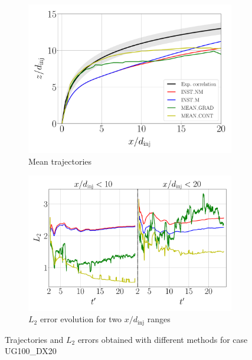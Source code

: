 \begin{figure}[ht]
\flushleft
\hspace{-0.5in}
\begin{subfigure}[b]{0.45\textwidth}
	\flushleft
   \includegraphics[scale=0.25]{./part2_developments/figures_ch5_resolved_JICF/results_trajectories/methods_comparison_trajectories_q6uG100_dx20.pdf}
   \vspace*{-0.15in}
   \caption{Mean trajectories}
\end{subfigure}
\hspace{0.25in}
\begin{subfigure}[b]{0.45\textwidth}
	\flushleft
   \includegraphics[scale=0.25]{./part2_developments/figures_ch5_resolved_JICF/results_trajectories/methods_comparison_L2_evolution_q6uG100_dx20_shared_y_axis.pdf}
   \vspace*{-0.25in}
   \caption{$L_2$ error evolution for two $x/d_\mathrm{inj}$ ranges}
\end{subfigure}
\caption{Trajectories and $L_2$ errors obtained with different methods for case UG100\_DX20}
\label{fig:JICF_trajectories_and_L2_comparison}
\end{figure}

